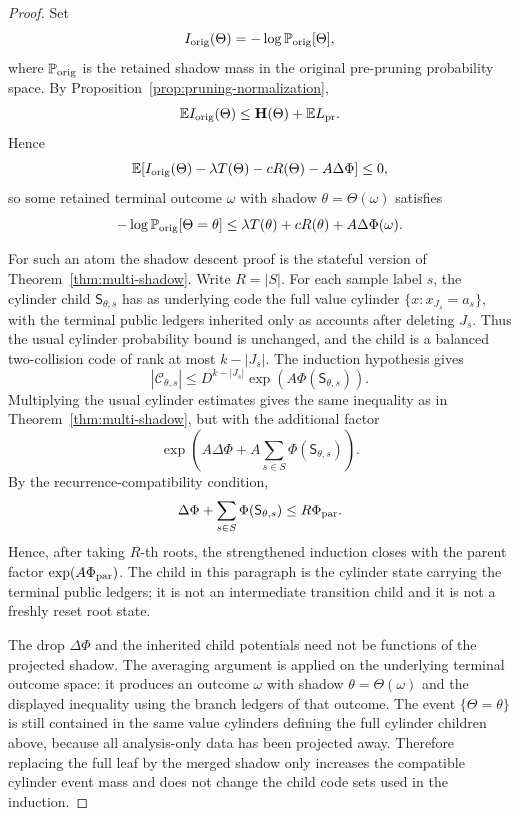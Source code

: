 \documentclass[11pt]{article}
\newcommand{\C}{\mathcal C}
\newcommand{\Prb}{\mathbb P}
\newcommand{\EE}{\mathbb E}
\newcommand{\bfH}{\mathbf H}
\begin{document}
\begin{proof}
Set
\[
  I_{\rm orig}(\Theta)=-\log\Prb_{\rm orig}[\Theta],
\]
where $\Prb_{\rm orig}$ is the retained shadow mass in the original
pre-pruning probability space.  By
Proposition~\ref{prop:pruning-normalization},
\[
  \EE I_{\rm orig}(\Theta)\le \bfH(\Theta)+\EE L_{\rm pr}.
\]
Hence
\[
  \EE\!\left[
    I_{\rm orig}(\Theta)-\lambda T(\Theta)-cR(\Theta)-A\Delta\Phi
  \right]\le 0,
\]
so some retained terminal outcome $\omega$ with shadow
$\theta=\Theta(\omega)$ satisfies
\[
  -\log\Prb_{\rm orig}[\Theta=\theta]
  \le
  \lambda T(\theta)+cR(\theta)+A\Delta\Phi(\omega).
\]

For such an atom the shadow descent proof is the stateful version of
Theorem~\ref{thm:multi-shadow}.  Write $R=|S|$.  For each sample label $s$,
the cylinder child $\mathsf S_{\theta,s}$ has as underlying code the full
value cylinder $\{x:x_{J_s}=a_s\}$, with the terminal public ledgers inherited
only as accounts after deleting $J_s$.  Thus the usual cylinder probability
bound is unchanged, and the child is a balanced two-collision code of rank at
most $k-|J_s|$.  The induction hypothesis gives
\[
  |\C_{\theta,s}|
  \le
  D^{k-|J_s|}\exp(A\Phi(\mathsf S_{\theta,s})).
\]
Multiplying the usual cylinder estimates gives the same inequality as in
Theorem~\ref{thm:multi-shadow}, but with the additional factor
\[
  \exp\!\left(A\Delta\Phi
       + A\sum_{s\in S}\Phi(\mathsf S_{\theta,s})\right).
\]
By the recurrence-compatibility condition,
\[
  \Delta\Phi+\sum_{s\in S}\Phi(\mathsf S_{\theta,s})
  \le
  R\Phi_{\rm par}.
\]
Hence, after taking $R$-th roots, the strengthened induction closes with the
parent factor $\exp(A\Phi_{\rm par})$.  The child in this paragraph is the
cylinder state carrying the terminal public ledgers; it is not an intermediate
transition child and it is not a freshly reset root state.

The drop $\Delta\Phi$ and the inherited child potentials need not be functions
of the projected shadow.  The averaging argument is applied on the underlying
terminal outcome space: it produces an outcome $\omega$ with shadow
$\theta=\Theta(\omega)$ and the displayed inequality using the branch ledgers
of that outcome.  The event $\{\Theta=\theta\}$ is still contained in the same
value cylinders defining the full cylinder children above, because all
analysis-only data has been projected away.  Therefore replacing the full leaf
by the merged shadow only increases the compatible cylinder event mass and does
not change the child code sets used in the induction.
\end{proof}
\end{document}

